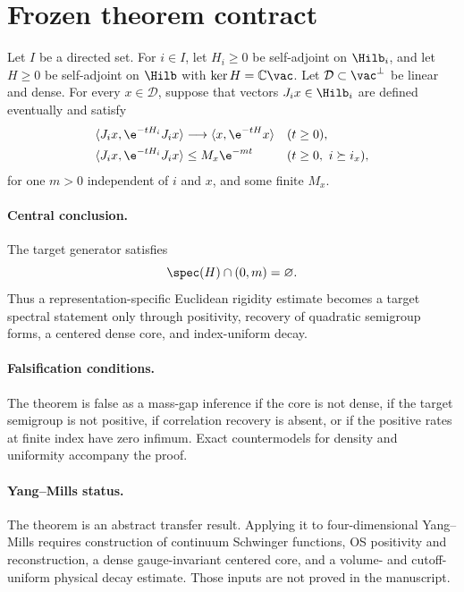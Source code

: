 \section*{Frozen theorem contract}

Let $I$ be a directed set.  For $i\in I$, let $H_i\geq0$ be self-adjoint on
$\Hilb_i$, and let $H\geq0$ be self-adjoint on $\Hilb$ with
$\ker H=\mathbb C\vac$.  Let $\mathcal D\subset\vac^\perp$ be linear and
dense.  For every $x\in\mathcal D$, suppose that vectors $J_i x\in\Hilb_i$
are defined eventually and satisfy
\begin{align*}
 \langle J_i x,\e^{-tH_i}J_i x\rangle
   &\longrightarrow \langle x,\e^{-tH}x\rangle
   &&(t\geq0),\\
 \langle J_i x,\e^{-tH_i}J_i x\rangle
   &\leq M_x\e^{-mt}
   &&(t\geq0,\ i\succeq i_x),
\end{align*}
for one $m>0$ independent of $i$ and $x$, and some finite $M_x$.

\paragraph{Central conclusion.}
The target generator satisfies
\[
  \spec(H)\cap(0,m)=\varnothing.
\]
Thus a representation-specific Euclidean rigidity estimate becomes a target
spectral statement only through positivity, recovery of quadratic semigroup
forms, a centered dense core, and index-uniform decay.

\paragraph{Falsification conditions.}
The theorem is false as a mass-gap inference if the core is not dense, if the
target semigroup is not positive, if correlation recovery is absent, or if
the positive rates at finite index have zero infimum.  Exact countermodels
for density and uniformity accompany the proof.

\paragraph{Yang--Mills status.}
The theorem is an abstract transfer result.  Applying it to four-dimensional
Yang--Mills requires construction of continuum Schwinger functions, OS
positivity and reconstruction, a dense gauge-invariant centered core, and a
volume- and cutoff-uniform physical decay estimate.  Those inputs are not
proved in the manuscript.
